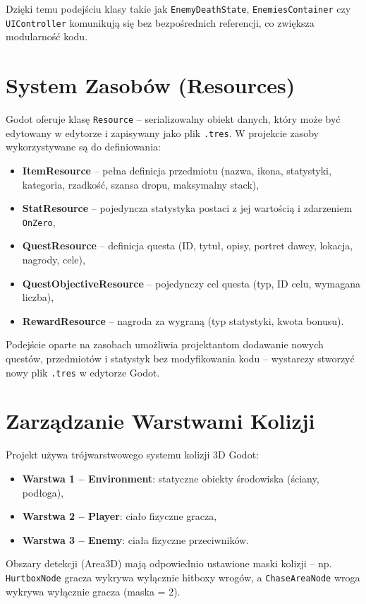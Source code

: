 Dzięki temu podejściu klasy takie jak \texttt{EnemyDeathState}, \texttt{EnemiesContainer} czy \texttt{UIController} komunikują się bez bezpośrednich referencji, co zwiększa modularność kodu.

\section{System Zasobów (Resources)}

Godot oferuje klasę \texttt{Resource} – serializowalny obiekt danych, który może być edytowany w edytorze i zapisywany jako plik \texttt{.tres}. W projekcie zasoby wykorzystywane są do definiowania:

\begin{itemize}
    \item \textbf{ItemResource} – pełna definicja przedmiotu (nazwa, ikona, statystyki, kategoria, rzadkość, szansa dropu, maksymalny stack),
    \item \textbf{StatResource} – pojedyncza statystyka postaci z jej wartością i zdarzeniem \texttt{OnZero},
    \item \textbf{QuestResource} – definicja questa (ID, tytuł, opisy, portret dawcy, lokacja, nagrody, cele),
    \item \textbf{QuestObjectiveResource} – pojedynczy cel questa (typ, ID celu, wymagana liczba),
    \item \textbf{RewardResource} – nagroda za wygraną (typ statystyki, kwota bonusu).
\end{itemize}

Podejście oparte na zasobach umożliwia projektantom dodawanie nowych questów, przedmiotów i statystyk bez modyfikowania kodu – wystarczy stworzyć nowy plik \texttt{.tres} w edytorze Godot.

\section{Zarządzanie Warstwami Kolizji}

Projekt używa trójwarstwowego systemu kolizji 3D Godot:
\begin{itemize}
    \item \textbf{Warstwa 1 – Environment}: statyczne obiekty środowiska (ściany, podłoga),
    \item \textbf{Warstwa 2 – Player}: ciało fizyczne gracza,
    \item \textbf{Warstwa 3 – Enemy}: ciała fizyczne przeciwników.
\end{itemize}

Obszary detekcji (Area3D) mają odpowiednio ustawione maski kolizji – np. \texttt{HurtboxNode} gracza wykrywa wyłącznie hitboxy wrogów, a \texttt{ChaseAreaNode} wroga wykrywa wyłącznie gracza (maska = 2).
